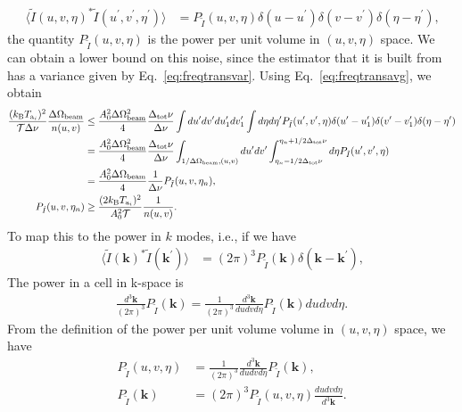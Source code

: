 \documentclass[11pt]{article}
\numberwithin{equation}{section}
\newcommand{\bt}[1]{\mathbf{#1}}
\newcommand{\wt}[1]{\widetilde{#1}}
\begin{document}
\begin{align}
  \langle \wt{I}(u, v, \eta)^\ast \wt{I}(u^\prime, v^\prime, \eta^\prime) \rangle & = P_{\tilde{I}}(u, v, \eta) \delta(u - u^\prime) \delta(v - v^\prime) \delta(\eta - \eta^\prime) \mbox{,}
\end{align}
the quantity $P_{\tilde{I}}(u, v, \eta)$ is the power per unit volume in $(u,v,\eta)$ space. We can obtain a lower bound on this noise, since the estimator that it is built from has a variance given by Eq.~\eqref{eq:freqtransvar}. Using Eq.~\eqref{eq:freqtransavg}, we obtain
\begin{align}
  \frac{( k_{\rm B} T_{{\rm a}_i})^2}{{\cal T} \Delta \nu}  \frac{\Delta \Omega_{\rm beam}}{n(u, v)} 
  & \leq \frac{A_0^2 \Delta \Omega_{\rm beam}^2}{4} \frac{\Delta_{\rm tot}\nu}{\Delta \nu} \int du^\prime dv^\prime du_1^\prime dv_1^\prime \int d\eta d\eta^\prime P_{\tilde{I}}(u^\prime, v^\prime, \eta) \delta(u^\prime - u_1^\prime) \delta(v^\prime - v_1^\prime) \delta(\eta - \eta^\prime) \notag \\
  & = \frac{A_0^2 \Delta \Omega_{\rm beam}^2}{4} \frac{\Delta_{\rm tot}\nu}{\Delta \nu} \int_{1/\Delta \Omega_{\rm beam},(u,v)} du^\prime dv^\prime \int_{\eta_n - 1/2\Delta_{\rm tot}\nu}^{\eta_n + 1/2\Delta_{\rm tot}\nu} d\eta P_{\tilde{I}}(u^\prime, v^\prime, \eta) \notag \\
  & = \frac{A_0^2 \Delta \Omega_{\rm beam}}{4} \frac{1}{\Delta \nu} P_{\tilde{I}}(u, v, \eta_n) \mbox{,} \\
  P_{\tilde{I}}(u, v, \eta_n) & \geq \frac{( 2 k_{\rm B} T_{{\rm a}_i})^2}{A_0^2 {\cal T}}  \frac{1}{n(u, v)} \mbox{.}
\end{align}
To map this to the power in $k$ modes, i.e., if we have 
\begin{align}
  \langle \wt{I}({\bt k})^\ast \wt{I}({\bt k}^\prime) \rangle & = (2\pi)^3 P_{\tilde{I}}({\bt k}) \delta({\bt k} - {\bt k}^\prime) \mbox{,}
\end{align}
The power in a cell in k-space is
\begin{align}
 \frac{d^3 {\bt k}}{(2\pi)^3} P_{\tilde{I}}({\bt k}) = \frac{1}{{(2\pi)^3}} \frac{d^3 {\bt k}}{du dv d\eta} P_{\tilde{I}}({\bt k}) du dv d\eta \mbox{.}
\end{align}
From the definition of the power per unit volume volume in $(u,v,\eta)$ space, we have
\begin{align}
  P_{\tilde{I}}(u, v, \eta) & = \frac{1}{{(2\pi)^3}} \frac{d^3 {\bt k}}{du dv d\eta} P_{\tilde{I}}({\bt k}) \mbox{,} \\
  P_{\tilde{I}}({\bt k}) & = (2\pi)^3 P_{\tilde{I}}(u, v, \eta) \frac{du dv d\eta}{d^3 {\bt k}} \mbox{.}
\end{align}
  
\end{document}
